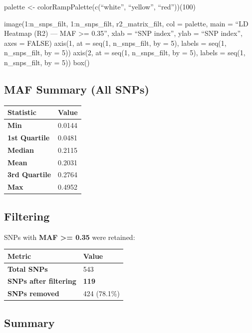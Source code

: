 \documentclass[
]{article}
\newcounter{none} %
\begin{document}
palette \textless- colorRampPalette(c(``white'', ``yellow'',
``red''))(100)

image(1:n\_snps\_filt, 1:n\_snps\_filt, r2\_matrix\_filt, col = palette,
main = ``LD Heatmap (R2) --- MAF \textgreater= 0.35'', xlab = ``SNP
index'', ylab = ``SNP index'', axes = FALSE) axis(1, at = seq(1,
n\_snps\_filt, by = 5), labels = seq(1, n\_snps\_filt, by = 5)) axis(2,
at = seq(1, n\_snps\_filt, by = 5), labels = seq(1, n\_snps\_filt, by =
5)) box()

\subsection{MAF Summary (All SNPs)}\label{maf-summary-all-snps}

{\def\LTcaptype{none} %
\begin{longtable}[]{@{}ll@{}}
\toprule\noalign{}
Statistic & Value \\
\midrule\noalign{}
\endhead
\bottomrule\noalign{}
\endlastfoot
\textbf{Min} & 0.0144 \\
\textbf{1st Quartile} & 0.0481 \\
\textbf{Median} & 0.2115 \\
\textbf{Mean} & 0.2031 \\
\textbf{3rd Quartile} & 0.2764 \\
\textbf{Max} & 0.4952 \\
\end{longtable}
}

\subsection{Filtering}\label{filtering}

SNPs with \textbf{MAF \textgreater= 0.35} were retained:

{\def\LTcaptype{none} %
\begin{longtable}[]{@{}ll@{}}
\toprule\noalign{}
Metric & Value \\
\midrule\noalign{}
\endhead
\bottomrule\noalign{}
\endlastfoot
\textbf{Total SNPs} & 543 \\
\textbf{SNPs after filtering} & \textbf{119} \\
\textbf{SNPs removed} & 424 (78.1\%) \\
\end{longtable}
}

\subsection{Summary}\label{summary}
\end{document}
